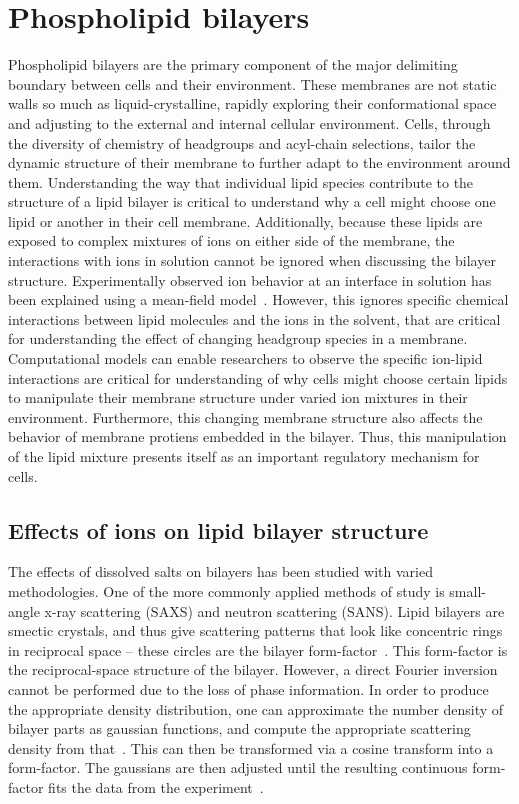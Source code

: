 \section{Phospholipid bilayers}
Phospholipid bilayers are the primary component of the major delimiting boundary between cells and their environment.
These membranes are not static walls so much as liquid-crystalline, rapidly exploring their conformational
space and adjusting to the external and internal cellular environment. Cells, through the 
diversity of chemistry of headgroups and acyl-chain selections, tailor the dynamic structure of their membrane to further
adapt to the environment around them. 
Understanding the way that individual lipid species contribute to the structure of a lipid bilayer is critical to understand
why a cell might choose one lipid or another in their cell membrane. Additionally, because these lipids are exposed to complex
mixtures of ions on either side of the membrane, the interactions with ions in solution cannot be ignored when discussing the bilayer structure. 
Experimentally observed ion behavior at an interface in solution has been explained using a mean-field model~\cite{israelachvilli:2011:intermol}.
However, this ignores specific chemical interactions between lipid molecules and the ions in the solvent, that are critical for understanding
the effect of changing headgroup species in a membrane. 
Computational models can enable researchers to observe the specific ion-lipid interactions are critical for understanding of 
why cells might choose certain lipids to manipulate their membrane structure under varied ion mixtures in their environment. Furthermore, this 
changing membrane structure also affects the behavior of membrane protiens embedded in the bilayer. Thus, this manipulation of the lipid mixture
presents itself as an important regulatory mechanism for cells.
\subsection{Effects of ions on lipid bilayer structure}
The effects of dissolved salts on bilayers has been studied with varied methodologies. 
One of the more commonly applied methods of study
is small-angle x-ray scattering (SAXS) and neutron scattering (SANS). 
Lipid bilayers are smectic crystals, and thus give scattering
patterns that look like concentric rings in reciprocal space -- these circles are the bilayer form-factor~\cite{nagle:2000}. This form-factor
is the reciprocal-space structure of the bilayer. 
However, a direct Fourier inversion cannot be performed due to the loss of phase information.
In order to produce the appropriate density distribution, one can approximate the number density of bilayer parts as gaussian functions, and 
compute the appropriate scattering density from that~\cite{nagle:2000,fogarty:2015}. This can then be transformed via a cosine transform
into a form-factor. The gaussians are then adjusted
until the resulting continuous form-factor fits the data from the experiment~\cite{nagle:2000,fogarty:2015}.

